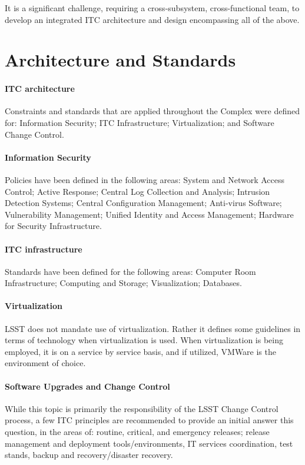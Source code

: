 \documentclass[11pt,twoside]{article}
\begin{document}
It is a significant challenge, requiring a cross-subsystem, cross-functional team, to develop an integrated ITC architecture and design encompassing all of the above.

\section{Architecture and Standards}

\paragraph{ITC architecture} Constraints and standards that are applied throughout the Complex were defined for: Information Security; ITC Infrastructure; Virtualization; and Software Change Control.

\paragraph*{Information Security} Policies have been defined in the following areas: System and Network Access Control; Active Response; Central Log Collection and Analysis; Intrusion Detection Systems; Central Configuration Management; Anti-virus Software; Vulnerability Management; Unified Identity and Access Management; Hardware for Security Infrastructure.

\paragraph*{ITC infrastructure} Standards have been defined for the following areas: Computer Room Infrastructure; Computing and Storage; Visualization; Databases.

\paragraph*{Virtualization} LSST does not mandate use of virtualization. Rather it defines some guidelines in terms of technology when virtualization is used. When virtualization is being employed, it is on a service by service basis, and if utilized, VMWare is the environment of choice.

\paragraph*{Software Upgrades and Change Control} While this topic is primarily the responsibility of the LSST Change Control process, a few ITC principles are recommended to provide an initial answer this question, in the areas of: routine, critical, and emergency releases; release management and deployment tools/environments, IT services coordination, test stands, backup and recovery/disaster recovery.
\end{document}
